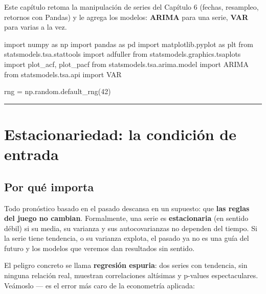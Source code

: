 \documentclass[
  spanish,
  letterpaper,
  DIV=11,
  numbers=noendperiod]{scrreprt}
\newenvironment{Shaded}{\begin{snugshade}}{\end{snugshade}}
\newcommand{\DecValTok}[1]{\textcolor[rgb]{0.68,0.00,0.00}{#1}}
\newcommand{\ImportTok}[1]{\textcolor[rgb]{0.00,0.46,0.62}{#1}}
\newcommand{\NormalTok}[1]{\textcolor[rgb]{0.00,0.23,0.31}{#1}}
\newcommand{\OperatorTok}[1]{\textcolor[rgb]{0.37,0.37,0.37}{#1}}
\begin{document}
Este capítulo retoma la manipulación de series del Capítulo 6 (fechas,
resampleo, retornos con Pandas) y le agrega los modelos: \textbf{ARIMA}
para una serie, \textbf{VAR} para varias a la vez.

\label{setup}
\begin{Shaded}
\begin{Highlighting}[]
\ImportTok{import}\NormalTok{ numpy }\ImportTok{as}\NormalTok{ np}
\ImportTok{import}\NormalTok{ pandas }\ImportTok{as}\NormalTok{ pd}
\ImportTok{import}\NormalTok{ matplotlib.pyplot }\ImportTok{as}\NormalTok{ plt}
\ImportTok{from}\NormalTok{ statsmodels.tsa.stattools }\ImportTok{import}\NormalTok{ adfuller}
\ImportTok{from}\NormalTok{ statsmodels.graphics.tsaplots }\ImportTok{import}\NormalTok{ plot\_acf, plot\_pacf}
\ImportTok{from}\NormalTok{ statsmodels.tsa.arima.model }\ImportTok{import}\NormalTok{ ARIMA}
\ImportTok{from}\NormalTok{ statsmodels.tsa.api }\ImportTok{import}\NormalTok{ VAR}

\NormalTok{rng }\OperatorTok{=}\NormalTok{ np.random.default\_rng(}\DecValTok{42}\NormalTok{)}
\end{Highlighting}
\end{Shaded}

\begin{center}\rule{0.5\linewidth}{0.5pt}\end{center}

\chapter{Estacionariedad: la condición de
entrada}\label{estacionariedad-la-condiciuxf3n-de-entrada}

\section{Por qué importa}\label{por-quuxe9-importa}

Todo pronóstico basado en el pasado descansa en un supuesto: que
\textbf{las reglas del juego no cambian}. Formalmente, una serie es
\textbf{estacionaria} (en sentido débil) si su media, su varianza y sus
autocovarianzas no dependen del tiempo. Si la serie tiene tendencia, o
su varianza explota, el pasado ya no es una guía del futuro y los
modelos que veremos dan resultados sin sentido.

El peligro concreto se llama \textbf{regresión espuria}: dos series con
tendencia, sin ninguna relación real, muestran correlaciones altísimas y
p-values espectaculares. Veámoslo --- es el error más caro de la
econometría aplicada:
\end{document}
